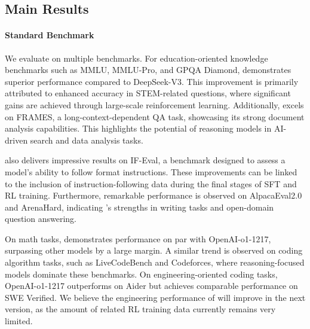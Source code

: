 \subsection{Main Results}

\paragraph{Standard Benchmark} \label{sec: benchmark}
We evaluate \dsri{} on multiple benchmarks. 
For education-oriented knowledge benchmarks such as MMLU, MMLU-Pro, and GPQA Diamond, \dsri{} demonstrates superior performance compared to DeepSeek-V3. This improvement is primarily attributed to enhanced accuracy in STEM-related questions, where significant gains are achieved through large-scale reinforcement learning. Additionally, \dsri{} excels on FRAMES, a long-context-dependent QA task, showcasing its strong document analysis capabilities. This highlights the potential of reasoning models in AI-driven search and data analysis tasks. 

\dsri{} also delivers impressive results on IF-Eval, a benchmark designed to assess a model's ability to follow format instructions. These improvements can be linked to the inclusion of instruction-following data during the final stages of SFT and RL training. Furthermore, remarkable performance is observed on AlpacaEval2.0 and ArenaHard, indicating \dsri{}’s strengths in writing tasks and open-domain question answering.

On math tasks, \dsri{} demonstrates performance on par with OpenAI-o1-1217, surpassing other models by a large margin. A similar trend is observed on coding algorithm tasks, such as LiveCodeBench and Codeforces, where reasoning-focused models dominate these benchmarks. On engineering-oriented coding tasks, OpenAI-o1-1217 outperforms \dsri{} on Aider but achieves comparable performance on SWE Verified. We believe the engineering performance of \dsri{} will improve in the next version, as the amount of related RL training data currently remains very limited. 



